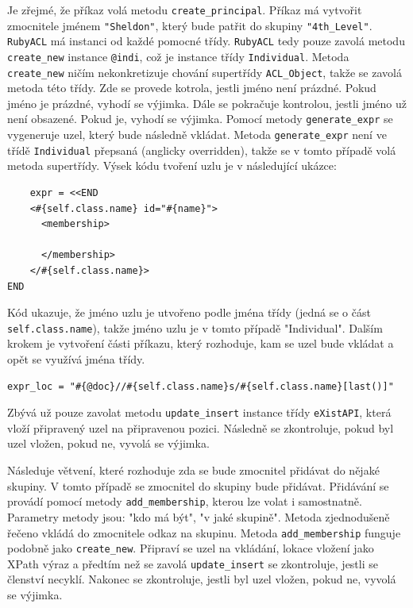 Je zřejmé, že příkaz volá metodu \verb|create_principal|. Příkaz má vytvořit zmocnitele jménem \verb|"Sheldon"|, který bude patřit do skupiny \verb|"4th_Level"|. \verb|RubyACL| má instanci od každé pomocné třídy. \verb|RubyACL| tedy pouze zavolá metodu \verb|create_new| instance \verb|@indi|, což je instance třídy \verb|Individual|. Metoda \verb|create_new| ničím nekonkretizuje chování supertřídy \verb|ACL_Object|, takže se zavolá metoda této třídy. Zde se provede kotrola, jestli jméno není prázdné. Pokud jméno je prázdné, vyhodí se výjimka. Dále se pokračuje kontrolou, jestli jméno už není obsazené. Pokud je, vyhodí se výjimka. Pomocí metody \verb|generate_expr| se vygeneruje uzel, který bude následně vkládat. Metoda \verb|generate_expr| není ve třídě \verb|Individual| přepsaná (anglicky overridden), takže se v tomto případě volá metoda supertřídy. Výsek kódu tvoření uzlu je v následující ukázce:
\\
\begin{lstlisting}
    expr = <<END
    <#{self.class.name} id="#{name}">
      <membership>
        
      </membership>
    </#{self.class.name}>
END
\end{lstlisting}
Kód ukazuje, že jméno uzlu je utvořeno podle jména třídy (jedná se o část \verb|self.class.name|), takže jméno uzlu je v tomto případě "Individual". Dalším krokem je vytvoření části příkazu, který rozhoduje, kam se uzel bude vkládat a opět se využívá jména třídy.
\\
\begin{lstlisting}
expr_loc = "#{@doc}//#{self.class.name}s/#{self.class.name}[last()]"
\end{lstlisting}
Zbývá už pouze zavolat metodu \verb|update_insert| instance třídy \verb|eXistAPI|, která vloží připravený uzel na připravenou pozici. Následně se zkontroluje, pokud byl uzel vložen, pokud ne, vyvolá se výjimka.

Následuje větvení, které rozhoduje zda se bude zmocnitel přidávat do nějaké skupiny. V tomto případě se zmocnitel do skupiny bude přidávat. Přidávání se provádí pomocí metody \verb|add_membership|, kterou lze volat i samostnatně. Parametry metody jsou: "kdo má být", "v jaké skupině". Metoda zjednodušeně řečeno vkládá do zmocnitele odkaz na skupinu. Metoda \verb|add_membership| funguje podobně jako \verb|create_new|. Připraví se uzel na vkládání, lokace vložení jako XPath výraz a předtím než se zavolá \verb|update_insert| se zkontroluje, jestli se členství necyklí. Nakonec se zkontroluje, jestli byl uzel vložen, pokud ne, vyvolá se výjimka.


